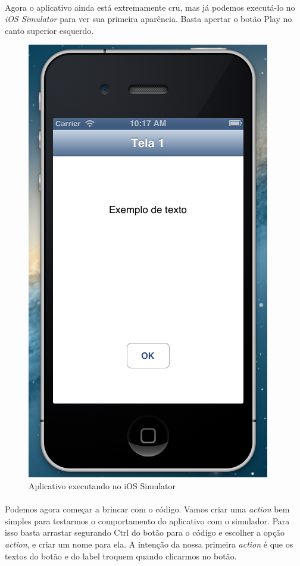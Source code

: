 \documentclass[a4paper,12pt,brazil,doubleside]{book}
\begin{document}
\paragraph{}Agora o aplicativo ainda está extremamente cru, mas já podemos executá-lo no \emph{iOS Simulator} para ver sua primeira aparência. Basta apertar o botão Play no canto superior esquerdo.

\begin{figure}[h]
  \centering
  \includegraphics[totalheight=0.4\textheight]{../figuras/ios/1/simulador1_tela1.png}
  \caption{Aplicativo executando no iOS Simulator}
  \label{fig:a}
\end{figure}

\bigskip

\paragraph{}Podemos agora começar a brincar com o código. Vamos criar uma \emph{action} bem simples para testarmos o comportamento do aplicativo com o simulador. Para isso basta arrastar segurando Ctrl do botão para o código e escolher a opção \emph{action}, e criar um nome para ela. A intenção da nossa primeira \emph{action} é que os textos do botão e do label troquem quando clicarmos no botão.
\end{document}
